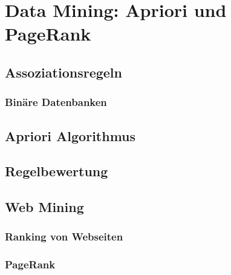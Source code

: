 \chapter{Data Mining: Apriori und PageRank} %

	\section{Assoziationsregeln} %

		\subsection{Binäre Datenbanken} %

	\section{Apriori Algorithmus} %

	\section{Regelbewertung} %

	\section{Web Mining} %

		\subsection{Ranking von Webseiten} %

		\subsection{PageRank} %
